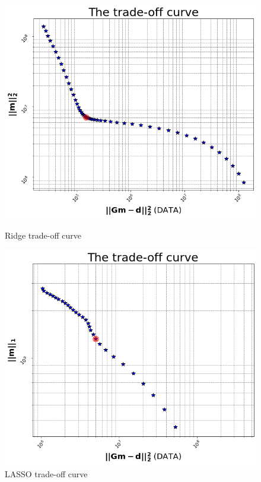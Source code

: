 \documentclass{article}
\begin{document}
\begin{figure}[!htb]
   \begin{minipage}{0.33\textwidth}
     \centering
     \includegraphics[width=.925\linewidth]{figures/Ridge_Trade_Off_USING.png}
     \caption{Ridge trade-off curve}\label{Fig:Data1a}
   \end{minipage}\hfill
   \begin{minipage}{0.33\textwidth}
     \centering
     \includegraphics[width=.925\linewidth]{figures/LASSO_Trade_Off_100_Zoomed_In_USING.png}
     \caption{LASSO trade-off curve}\label{Fig:Data1b}
   \end{minipage}

\end{figure}
\end{document}
